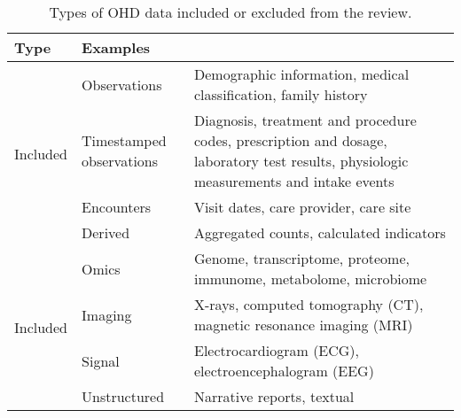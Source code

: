 \begin{table}
\center
  \caption{Types of OHD data included or excluded from the review.}\label{tab:include}
  
  \begin{tabular}{@{}lll@{}}\toprule
  Type & Examples \\ \midrule
  
  \multirow{4}{*}{Included} & Observations & Demographic information, medical classification, family history \\
  &Timestamped observations & Diagnosis, treatment and procedure codes, prescription and dosage, laboratory test results, physiologic measurements and intake events \\
  &Encounters & Visit dates, care provider, care site \\
  &Derived & Aggregated counts, calculated indicators \\ \midrule

  \multirow{4}{*}{Included} &Omics & Genome, transcriptome, proteome, immunome, metabolome, microbiome \\
  &Imaging & X-rays, computed tomography (CT), magnetic resonance imaging (MRI) \\
  &Signal & Electrocardiogram (ECG), electroencephalogram (EEG) \\
  &Unstructured & Narrative reports, textual \\ \bottomrule
  \end{tabular}%
\end{table}